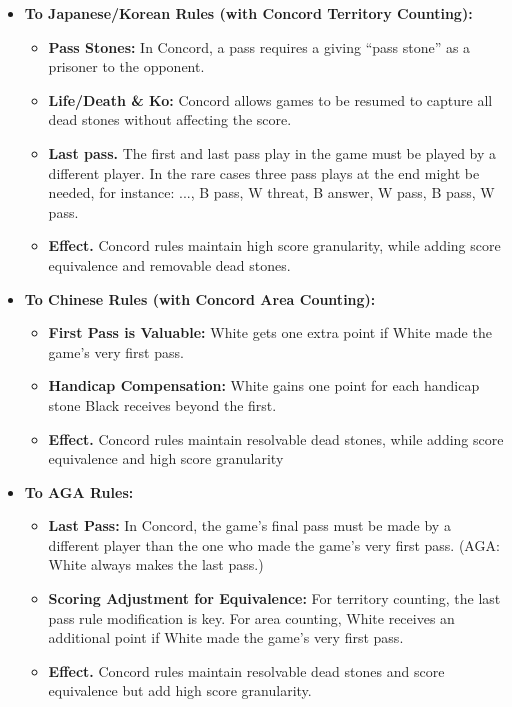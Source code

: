 \documentclass[11pt]{article}
\begin{document}
\begin{itemize}
\item \textbf{To Japanese/Korean Rules (with Concord Territory Counting):}
    \begin{itemize}
    \item \textbf{Pass Stones:} In Concord, a pass requires a giving ``pass stone'' as a prisoner to the opponent.
    \item \textbf{Life/Death \& Ko:} Concord allows games to be resumed to capture all dead stones without affecting the score.
    \item \textbf{Last pass.} The first and last pass play in the game must be played by a different player. In the rare cases three pass plays at the end might be needed, for instance: ..., B pass, W threat, B answer, W pass, B pass, W pass.
    \item \textbf{Effect.} Concord rules maintain high score granularity, while adding score equivalence and removable dead stones.
    \end{itemize}

\item \textbf{To Chinese Rules (with Concord Area Counting):}
    \begin{itemize}
    \item \textbf{First Pass is Valuable:} White gets one extra point if White made the game's very first pass.
    \item \textbf{Handicap Compensation:} White gains one point for each handicap stone Black receives beyond the first.
    \item \textbf{Effect.} Concord rules maintain resolvable dead stones, while adding score equivalence and high score granularity
    \end{itemize}

\item \textbf{To AGA Rules:}
    \begin{itemize}
    \item \textbf{Last Pass:} In Concord, the game's final pass must be made by a different player than the one who made the game's very first pass. (AGA: White always makes the last pass.)
    \item \textbf{Scoring Adjustment for Equivalence:} For territory counting, the last pass rule modification is key. For area counting, White receives an additional point if White made the game's very first pass.
    \item \textbf{Effect.} Concord rules maintain resolvable dead stones and score equivalence but add high score granularity.
    \end{itemize}
\end{itemize}
\end{document}
